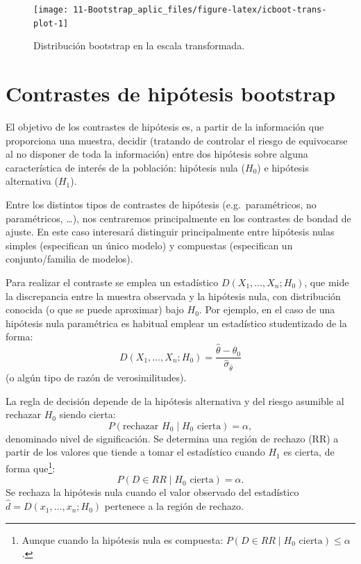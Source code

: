 \documentclass[
  10pt,
]{book}
\theoremstyle{break}
\theoremstyle{nonumberplain}
\let\oldfootnote\footnote
\renewcommand\footnote[1]{\oldfootnote{\hspace{2mm}#1}}
\begin{document}
\begin{figure}[!htbp]

{\centering \texttt{[image: 11-Bootstrap\_aplic\_files/figure-latex/icboot-trans-plot-1]} 

}

\caption{Distribución bootstrap en la escala transformada.}\label{fig:icboot-trans-plot}
\end{figure}

\hypertarget{boot-test}{%
\section{Contrastes de hipótesis bootstrap}\label{boot-test}}

El objetivo de los contrastes de hipótesis es, a partir de la información
que proporciona una muestra, decidir (tratando de controlar el riesgo de
equivocarse al no disponer de toda la información)
entre dos hipótesis sobre alguna característica de interés de la población:
hipótesis nula (\(H_{0}\)) e hipótesis alternativa (\(H_{1}\)).

Entre los distintos tipos de contrastes de hipótesis (e.g.~paramétricos,
no paramétricos, \ldots), nos centraremos principalmente en los contrastes
de bondad de ajuste. En este caso interesará distinguir principalmente
entre hipótesis nulas simples (especifican un único modelo) y compuestas
(especifican un conjunto/familia de modelos).

Para realizar el contraste se emplea un estadístico \(D\left( X_1,\ldots ,X_n;H_0\right)\),
que mide la discrepancia entre la muestra observada y la hipótesis nula,
con distribución conocida (o que se puede aproximar) bajo \(H_0\).
Por ejemplo, en el caso de una hipótesis nula paramétrica
es habitual emplear un estadístico studentizado de la forma:
\[D\left( X_1,\ldots ,X_n;H_0\right) =
\frac{\hat{\theta}-\theta _0}{\hat\sigma_{\hat\theta}}\]
(o algún tipo de razón de verosimilitudes).

La regla de decisión depende de la hipótesis alternativa y
del riesgo asumible al rechazar \(H_0\) siendo cierta:
\[P\left( \text{rechazar }H_0\mid H_0\text{ cierta}\right) =\alpha,\]
denominado nivel de significación.
Se determina una región de rechazo (RR) a partir de los valores que tiende
a tomar el estadístico cuando \(H_1\) es cierta,
de forma que\footnote{Aunque cuando la hipótesis nula es compuesta:
  \(P\left( D\in RR \mid H_0\text{ cierta}\right) \leq \alpha\).}:
\[P\left( D\in RR \mid H_0\text{ cierta}\right) =\alpha.\]
Se rechaza la hipótesis nula cuando el valor observado del
estadístico \(\hat{d}=D\left( x_1,\ldots ,x_n;H_0\right)\) pertenece
a la región de rechazo.
\end{document}
